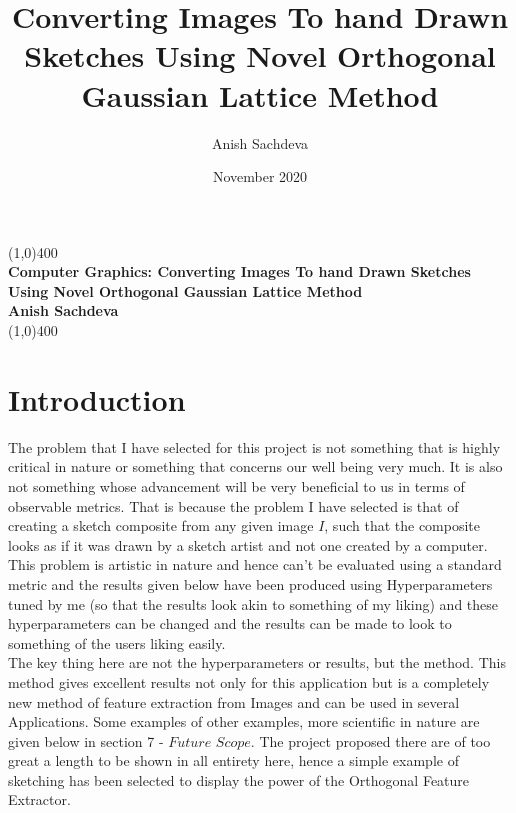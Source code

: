 \documentclass{article}
\title{Converting Images To hand Drawn Sketches Using Novel Orthogonal Gaussian Lattice Method}
\author{Anish Sachdeva}
\date{November 2020}
\begin{document}
\begin{titlepage}
\begin{center}
\vspace*{1cm}
\vfill
\line(1,0){400}\\[1mm]
\huge{\textbf{Computer Graphics: Converting Images To hand Drawn Sketches Using Novel Orthogonal Gaussian Lattice Method}}\\[3mm]
\Large{\textbf{Anish Sachdeva}}\\[1mm]
\line(1,0){400}

\vfill  

\end{center}
\end{titlepage}


\tableofcontents
\thispagestyle{empty}
\clearpage

\clearpage
\setcounter{page}{1}


\clearpage
\section{Introduction}
The problem that I have selected for this project is not something that is highly critical in nature or something that concerns our well being very much. It is also not something whose advancement will be very beneficial to us in terms of observable metrics. That is because the problem I have selected is that of creating a sketch composite from any given image $I$, such that the composite looks as if it was drawn by a sketch artist and not one created by a computer.\\

This problem is artistic in nature and hence can't be evaluated using a standard metric and the results given below have been produced using Hyperparameters tuned by me (so that the results look akin to something of my liking) and these hyperparameters can be changed and the results can be made to look to something of the users liking easily. \\

The key thing here are not the hyperparameters or results, but the method. This method gives excellent 
results not only for this application but is a completely new method of feature extraction from Images 
and can be used in several Applications. Some examples of other examples, more scientific in nature are 
given below in section 7 - $\textit{Future Scope}$. The project proposed there are of too great a length to 
be shown in all entirety here, hence a simple example of sketching has been selected to display the power 
of the Orthogonal Feature Extractor. \\
\end{document}
